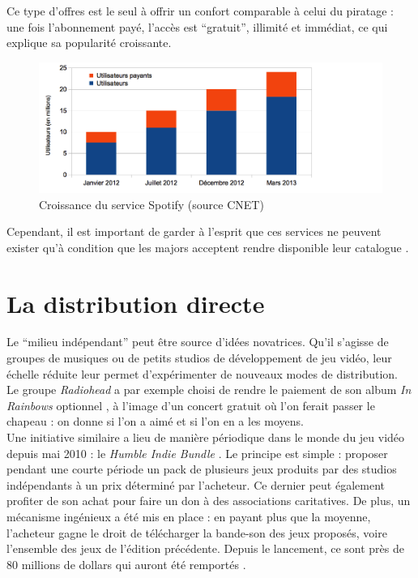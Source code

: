 \documentclass[a4paper]{report}
\begin{document}
	Ce type d'offres est le seul à offrir un confort comparable à celui du piratage : une fois l'abonnement payé, l'accès est ``gratuit'', illimité et immédiat, ce qui explique sa popularité croissante.

	\begin{figure}[ht]
		\begin{center}
			\includegraphics[width=14cm]{images/spotify-croissance.png}
			\caption{Croissance du service Spotify (source CNET)}
		\end{center}
	\end{figure}

	Cependant, il est important de garder à l'esprit que ces services ne peuvent exister qu'à condition que les majors acceptent rendre disponible leur catalogue \cite{podcast-industrie-musicale}.

	\section{La distribution directe}
	Le ``milieu indépendant'' peut être source d'idées novatrices. Qu'il s'agisse de groupes de musiques ou de petits studios de développement de jeu vidéo, leur échelle réduite leur permet d'expérimenter de nouveaux modes de distribution.\\

	Le groupe \emph{Radiohead} a par exemple choisi de rendre le paiement de son album \emph{In Rainbows} optionnel \cite{radiohead}, à l'image d'un concert gratuit où l'on ferait passer le chapeau : on donne si l'on a aimé et si l'on en a les moyens.\\

	Une initiative similaire a lieu de manière périodique dans le monde du jeu vidéo depuis mai 2010 : le \emph{Humble Indie Bundle} \cite{humble-indie-bundle}. Le principe est simple : proposer pendant une courte période un pack de plusieurs jeux produits par des studios indépendants à un prix déterminé par l'acheteur. Ce dernier peut également profiter de son achat pour faire un don à des associations caritatives. De plus, un mécanisme ingénieux a été mis en place : en payant plus que la moyenne, l'acheteur gagne le droit de télécharger la bande-son des jeux proposés, voire l'ensemble des jeux de l'édition précédente. Depuis le lancement, ce sont près de 80 millions de dollars qui auront été remportés \cite{humble-stats}.\\
\end{document}
